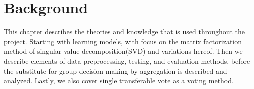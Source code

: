 \chapter{Background}\label{background}

This chapter describes the theories and knowledge that is used throughout the project. Starting with learning models, with focus on the matrix factorization method of singular value decomposition(SVD) and variations hereof. Then we describe elements of data preprocessing, testing, and evaluation methods, before the substitute for group decision making by aggregation is described and analyzed. Lastly, we also cover single transferable vote as a voting method.





